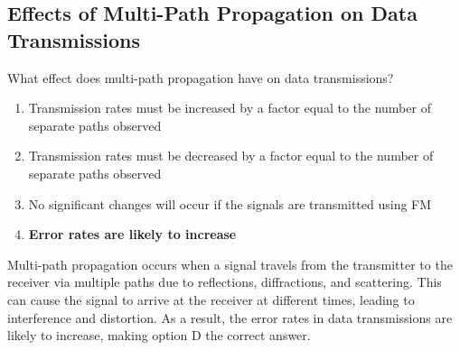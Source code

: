 \subsection{Effects of Multi-Path Propagation on Data Transmissions}
\label{T3A10}

\begin{tcolorbox}[colback=gray!10!white,colframe=black!75!black,title=T3A10]
What effect does multi-path propagation have on data transmissions?
\begin{enumerate}[noitemsep]
    \item Transmission rates must be increased by a factor equal to the number of separate paths observed
    \item Transmission rates must be decreased by a factor equal to the number of separate paths observed
    \item No significant changes will occur if the signals are transmitted using FM
    \item \textbf{Error rates are likely to increase}
\end{enumerate}
\end{tcolorbox}

Multi-path propagation occurs when a signal travels from the transmitter to the receiver via multiple paths due to reflections, diffractions, and scattering. This can cause the signal to arrive at the receiver at different times, leading to interference and distortion. As a result, the error rates in data transmissions are likely to increase, making option D the correct answer.


